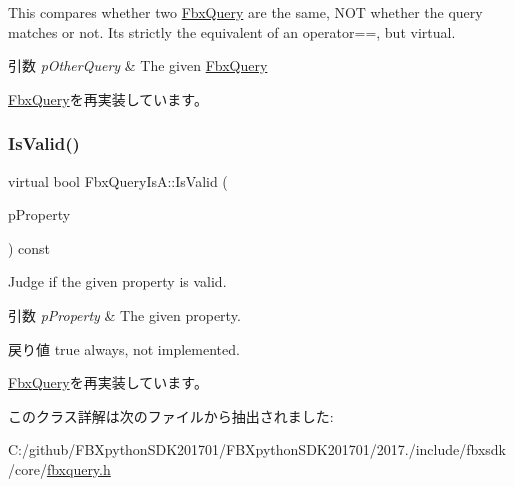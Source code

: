 This compares whether two \hyperlink{class_fbx_query}{Fbx\+Query} are the same, N\+OT whether the query matches or not. It\textquotesingle{}s strictly the equivalent of an operator==, but virtual. 
\begin{DoxyParams}{引数}
{\em p\+Other\+Query} & The given \hyperlink{class_fbx_query}{Fbx\+Query} \\
\hline
\end{DoxyParams}


\hyperlink{class_fbx_query_adfc24c7306ceed2fcfd8c67198e0c1dd}{Fbx\+Query}を再実装しています。

\mbox{\label{class_fbx_query_is_a_a6d3da2f05ab6e50346af8e9713168772}} 
\subsubsection{\texorpdfstring{Is\+Valid()}{IsValid()}}
{\footnotesize\ttfamily virtual bool Fbx\+Query\+Is\+A\+::\+Is\+Valid (\begin{DoxyParamCaption}\item[{const \hyperlink{class_fbx_property}{Fbx\+Property} \&}]{p\+Property }\end{DoxyParamCaption}) const\hspace{0.3cm}{\ttfamily [virtual]}}

Judge if the given property is valid. 
\begin{DoxyParams}{引数}
{\em p\+Property} & The given property. \\
\hline
\end{DoxyParams}
\begin{DoxyReturn}{戻り値}
{\ttfamily true} always, not implemented. 
\end{DoxyReturn}


\hyperlink{class_fbx_query_a822776baf45a56d8e126e948ec25d920}{Fbx\+Query}を再実装しています。



このクラス詳解は次のファイルから抽出されました\+:\begin{DoxyCompactItemize}
\item 
C\+:/github/\+F\+B\+Xpython\+S\+D\+K201701/\+F\+B\+Xpython\+S\+D\+K201701/2017./include/fbxsdk/core/\hyperlink{fbxquery_8h}{fbxquery.\+h}\end{DoxyCompactItemize}
